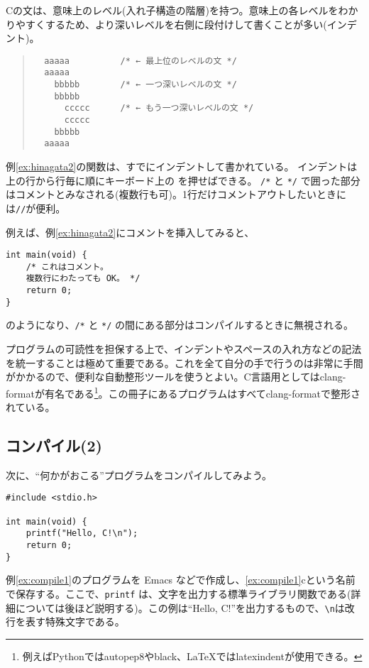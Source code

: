 Cの文は、意味上のレベル(入れ子構造の階層)を持つ。意味上の各レベルをわかりやすくするため、より深いレベルを右側に段付けして書くことが多い(インデント)。
\begin{quote}
    \begin{verbatim}
  aaaaa          /* ← 最上位のレベルの文 */
  aaaaa
    bbbbb        /* ← 一つ深いレベルの文 */
    bbbbb
      ccccc      /* ← もう一つ深いレベルの文 */
      ccccc
    bbbbb
  aaaaa
\end{verbatim}
\end{quote}
例\ref{ex:hinagata2}の関数は、すでにインデントして書かれている。
インデントは上の行から行毎に順にキーボード上の \tabkey を押せばできる。
\texttt{/*} と \texttt{*/} で囲った部分はコメントとみなされる(複数行も可)。1行だけコメントアウトしたいときには\texttt{//}が便利。

例えば、例\ref{ex:hinagata2}にコメントを挿入してみると、
\begin{reidai}
    \begin{verbatim}
int main(void) {
    /* これはコメント。
    複数行にわたっても OK。 */
    return 0;
}
\end{verbatim}
\end{reidai} \noindent
のようになり、\texttt{/*} と \texttt{*/} の間にある部分はコンパイルするときに無視される。

プログラムの可読性を担保する上で、インデントやスペースの入れ方などの記法を統一することは極めて重要である。これを全て自分の手で行うのは非常に手間がかかるので、便利な自動整形ツールを使うとよい。C言語用としてはclang-formatが有名である\footnote{例えばPythonではautopep8やblack、\LaTeX ではlatexindentが使用できる。}。この冊子にあるプログラムはすべてclang-formatで整形されている。

\subsection{コンパイル(2)}

次に、``何かがおこる''プログラムをコンパイルしてみよう。
\begin{reidai}\label{ex:compile1}
    \begin{verbatim}
#include <stdio.h>

int main(void) {
    printf("Hello, C!\n");
    return 0;
}
\end{verbatim}
\end{reidai} \noindent
例\ref{ex:compile1}のプログラムを Emacs などで作成し、\ref{ex:compile1}cという名前で保存する。ここで、\texttt{printf} は、文字を出力する標準ライブラリ関数である(詳細については後ほど説明する)。この例は``Hello, C!''を出力するもので、\texttt{\textbackslash n}は改行を表す特殊文字である。

